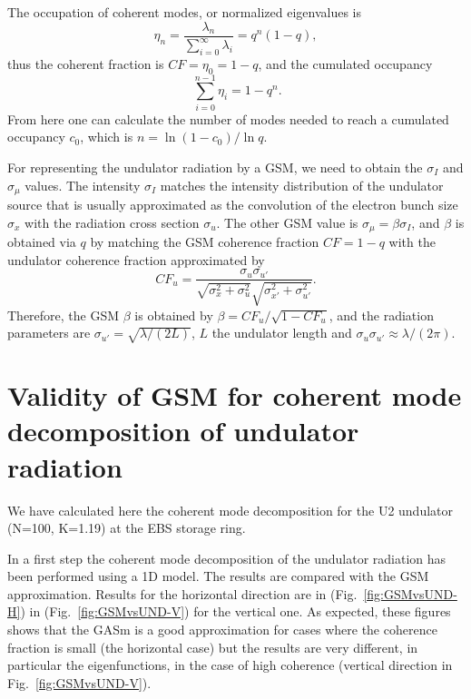 \documentclass{iucr}              %
\begin{document}
The occupation of coherent modes, or normalized eigenvalues is   
\begin{equation}
\eta_n = \frac{\lambda_n}{\sum_{i=0}^{\infty} \lambda_i} = q^n(1-q), 
\end{equation}
thus the coherent fraction is $CF=\eta_0=1-q$, and the cumulated occupancy
\begin{equation}
\ \sum_{i=0}^{n-1} \eta_i = 1-q^n. 
\end{equation}
From here one can calculate the number of modes needed to reach a cumulated occupancy $c_0$, which is $n=\ln(1-c_0)/\ln q$.

For representing the undulator radiation by a GSM, we need to obtain the $\sigma_I$ and $\sigma_\mu$ values. The intensity $\sigma_I$ matches the intensity distribution of the undulator source that is usually approximated as the convolution of the electron bunch size $\sigma_x$ with the radiation cross section $\sigma_u$. The other GSM value is $\sigma_\mu=\beta\sigma_I$, and $\beta$ is obtained via $q$ by matching the GSM coherence fraction $CF=1-q$ with the undulator coherence fraction approximated by
\begin{equation}
    CF_u = \frac{\sigma_u\sigma_{u'}}{\sqrt{\sigma_x^2+\sigma_u^2}\sqrt{\sigma_{x'}^2+\sigma_{u'}^2}}.
\end{equation}
Therefore, the GSM $\beta$ is obtained by $\beta=CF_u/\sqrt{1-CF_u}$,
and the radiation parameters are $\sigma_{u'}=\sqrt{\lambda/(2L)}$, $L$ the undulator length and $\sigma_u \sigma_{u'} \approx \lambda / (2 \pi)$.


\section{Validity of GSM for coherent mode decomposition of undulator radiation}
\label{appendix:validity}

We have calculated here the coherent mode decomposition for the U2 undulator (N=100, K=1.19) at the EBS storage ring. 

In a first step the coherent mode decomposition of the undulator radiation has been performed using a 1D model. The results are compared with the GSM approximation. Results for the horizontal direction are in (Fig.~\ref{fig:GSMvsUND-H}) in (Fig.~\ref{fig:GSMvsUND-V}) for the vertical one. As expected, these figures shows that the GASm is a good approximation for cases where the coherence fraction is small (the horizontal case) but the results are very different, in particular the eigenfunctions, in the case of high coherence (vertical direction in Fig.~\ref{fig:GSMvsUND-V}).
\end{document}
